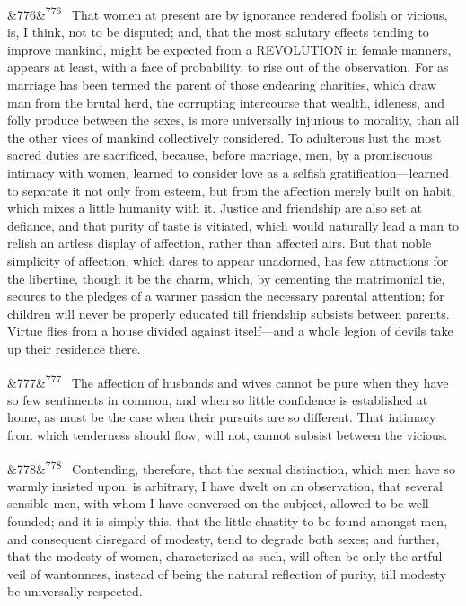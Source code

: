\documentclass[12pt]{article}
\newcommand{\para}[1][]{\par\noindent\ifx&#1&\else\textsuperscript{\footnotesize #1}~\fi}
\begin{document}
\para[776] That women at present are by ignorance rendered foolish or vicious, is, I think, not to be disputed; and, that the most salutary effects tending to improve mankind, might be expected from a REVOLUTION in female manners, appears at least, with a face of probability, to rise out of the observation. For as marriage has been termed the parent of those endearing charities, which draw man from the brutal herd, the corrupting intercourse that wealth, idleness, and folly produce between the sexes, is more universally injurious to morality, than all the other vices of mankind collectively considered. To adulterous lust the most sacred duties are sacrificed, because, before marriage, men, by a promiscuous intimacy with women, learned to consider love as a selfish gratification---learned to separate it not only from esteem, but from the affection merely built on habit, which mixes a little humanity with it. Justice and friendship are also set at defiance, and that purity of taste is vitiated, which would naturally lead a man to relish an artless display of affection, rather than affected airs. But that noble simplicity of affection, which dares to appear unadorned, has few attractions for the libertine, though it be the charm, which, by cementing the matrimonial tie, secures to the pledges of a warmer passion the necessary parental attention; for children will never be properly educated till friendship subsists between parents. Virtue flies from a house divided against itself---and a whole legion of devils take up their residence there.

\para[777] The affection of husbands and wives cannot be pure when they have so few sentiments in common, and when so little confidence is established at home, as must be the case when their pursuits are so different. That intimacy from which tenderness should flow, will not, cannot subsist between the vicious.

\para[778] Contending, therefore, that the sexual distinction, which men have so warmly insisted upon, is arbitrary, I have dwelt on an observation, that several sensible men, with whom I have conversed on the subject, allowed to be well founded; and it is simply this, that the little chastity to be found amongst men, and consequent disregard of modesty, tend to degrade both sexes; and further, that the modesty of women, characterized as such, will often be only the artful veil of wantonness, instead of being the natural reflection of purity, till modesty be universally respected.
\end{document}
